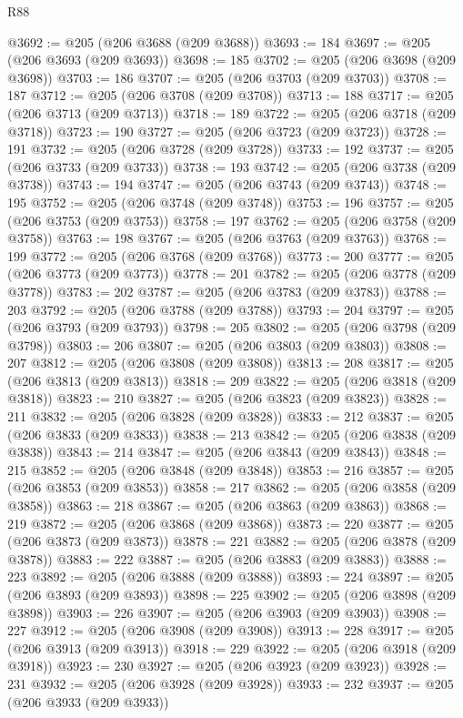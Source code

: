 \begin{lexlean}{R88}
\begin{coremodule}
@3692 := @205 (@206 @3688 (@209 @3688))
@3693 := 184
@3697 := @205 (@206 @3693 (@209 @3693))
@3698 := 185
@3702 := @205 (@206 @3698 (@209 @3698))
@3703 := 186
@3707 := @205 (@206 @3703 (@209 @3703))
@3708 := 187
@3712 := @205 (@206 @3708 (@209 @3708))
@3713 := 188
@3717 := @205 (@206 @3713 (@209 @3713))
@3718 := 189
@3722 := @205 (@206 @3718 (@209 @3718))
@3723 := 190
@3727 := @205 (@206 @3723 (@209 @3723))
@3728 := 191
@3732 := @205 (@206 @3728 (@209 @3728))
@3733 := 192
@3737 := @205 (@206 @3733 (@209 @3733))
@3738 := 193
@3742 := @205 (@206 @3738 (@209 @3738))
@3743 := 194
@3747 := @205 (@206 @3743 (@209 @3743))
@3748 := 195
@3752 := @205 (@206 @3748 (@209 @3748))
@3753 := 196
@3757 := @205 (@206 @3753 (@209 @3753))
@3758 := 197
@3762 := @205 (@206 @3758 (@209 @3758))
@3763 := 198
@3767 := @205 (@206 @3763 (@209 @3763))
@3768 := 199
@3772 := @205 (@206 @3768 (@209 @3768))
@3773 := 200
@3777 := @205 (@206 @3773 (@209 @3773))
@3778 := 201
@3782 := @205 (@206 @3778 (@209 @3778))
@3783 := 202
@3787 := @205 (@206 @3783 (@209 @3783))
@3788 := 203
@3792 := @205 (@206 @3788 (@209 @3788))
@3793 := 204
@3797 := @205 (@206 @3793 (@209 @3793))
@3798 := 205
@3802 := @205 (@206 @3798 (@209 @3798))
@3803 := 206
@3807 := @205 (@206 @3803 (@209 @3803))
@3808 := 207
@3812 := @205 (@206 @3808 (@209 @3808))
@3813 := 208
@3817 := @205 (@206 @3813 (@209 @3813))
@3818 := 209
@3822 := @205 (@206 @3818 (@209 @3818))
@3823 := 210
@3827 := @205 (@206 @3823 (@209 @3823))
@3828 := 211
@3832 := @205 (@206 @3828 (@209 @3828))
@3833 := 212
@3837 := @205 (@206 @3833 (@209 @3833))
@3838 := 213
@3842 := @205 (@206 @3838 (@209 @3838))
@3843 := 214
@3847 := @205 (@206 @3843 (@209 @3843))
@3848 := 215
@3852 := @205 (@206 @3848 (@209 @3848))
@3853 := 216
@3857 := @205 (@206 @3853 (@209 @3853))
@3858 := 217
@3862 := @205 (@206 @3858 (@209 @3858))
@3863 := 218
@3867 := @205 (@206 @3863 (@209 @3863))
@3868 := 219
@3872 := @205 (@206 @3868 (@209 @3868))
@3873 := 220
@3877 := @205 (@206 @3873 (@209 @3873))
@3878 := 221
@3882 := @205 (@206 @3878 (@209 @3878))
@3883 := 222
@3887 := @205 (@206 @3883 (@209 @3883))
@3888 := 223
@3892 := @205 (@206 @3888 (@209 @3888))
@3893 := 224
@3897 := @205 (@206 @3893 (@209 @3893))
@3898 := 225
@3902 := @205 (@206 @3898 (@209 @3898))
@3903 := 226
@3907 := @205 (@206 @3903 (@209 @3903))
@3908 := 227
@3912 := @205 (@206 @3908 (@209 @3908))
@3913 := 228
@3917 := @205 (@206 @3913 (@209 @3913))
@3918 := 229
@3922 := @205 (@206 @3918 (@209 @3918))
@3923 := 230
@3927 := @205 (@206 @3923 (@209 @3923))
@3928 := 231
@3932 := @205 (@206 @3928 (@209 @3928))
@3933 := 232
@3937 := @205 (@206 @3933 (@209 @3933))

\end{coremodule}
\end{lexlean}
